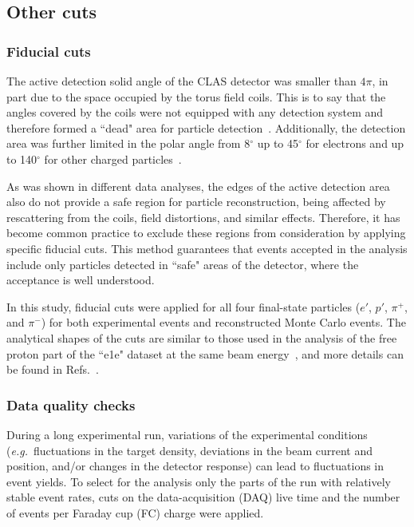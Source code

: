 \documentclass[prc,twocolumn,superscriptaddress,showpacs,amssymb,amsmath,amsfonts,aps,nofootinbib]{revtex4-1}
\begin{document}
\subsection{Other cuts}

\subsubsection{Fiducial cuts}

The active detection solid angle of the CLAS detector was smaller than $4\pi$, in part due to the space occupied by the torus field coils. This is to say that the angles covered by the coils were not equipped with any detection system and therefore formed a ``dead" area for particle detection~\cite{Mecking:2003zu}. Additionally, the detection area was further limited in the polar angle from 8$^{\circ}\mathrm{}$ up to 45$^{\circ}\mathrm{}$ for electrons and up to 140$^{\circ}\mathrm{}$ for other charged particles~\cite{Mecking:2003zu}. 

As was shown in different data analyses, the edges of the active detection area also do not provide a safe region for particle reconstruction, being affected by rescattering from the coils, field distortions, and similar effects. Therefore, it has become common practice to exclude these regions from consideration by applying specific fiducial cuts. This method guarantees that events accepted in the analysis include only particles detected in ``safe" areas of the detector, where the acceptance is well understood. 


In this study, fiducial cuts were applied for all four final-state particles ($e'$, $p'$, $\pi^{+}$, and $\pi^{-}$) for both experimental events and reconstructed Monte Carlo events. The analytical shapes of the cuts are similar to those used in the analysis of the free proton part of the ``e1e" dataset at the same beam energy~\cite{Fed_an_note:2017,Fed_paper_2018}, and more details can be found in Refs.\!~\cite{my_an_note:2020, my_thesis:2021}.


\subsubsection{Data quality checks}

During a long experimental run, variations of the experimental conditions ({\it e.g.}~fluctuations in the target density, deviations in the beam current and position, and/or changes in the detector response) can lead to fluctuations in event yields. To select for the analysis only the parts of the run with relatively stable event rates, cuts on the data-acquisition (DAQ) live time and the number of events per Faraday cup (FC) charge were applied.
\end{document}
